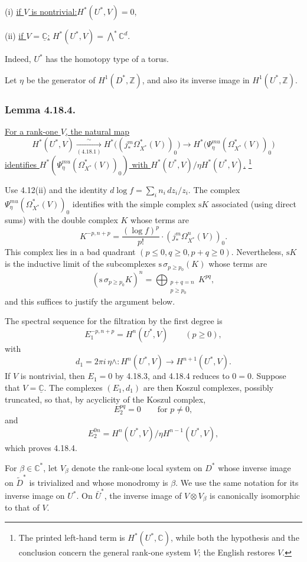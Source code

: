 \noindent\textup{(i)}\qquad
\uline{if $V$ is nontrivial:}\quad $H^*(U^*,V)=0$,

\medskip
\noindent\textup{(ii)}\qquad
\uline{if $V=\underline{\mathbb C}$:}\quad
$H^*(U^*,V)=\bigwedge\nolimits^*\mathbb C^d$.

Indeed, $U^*$ has the homotopy type of a torus.

Let $\eta$ be the generator of $H^1(D^*,\mathbb Z)$, and also its
inverse image in $H^1(U^*,\mathbb Z)$.

\subsubsection*{Lemma 4.18.4.}
\underline{For a rank-one $V$, the natural map}
\[
H^*(U^*,V)
 \xrightarrow[(4.18.1)]{\ \sim\ }
H^*\bigl((j_*^m\Omega_{X^*}^*(V))_0\bigr)
 \longrightarrow
H^*\bigl(\Psi_\eta^{mu}(\Omega_{X^*}^*(V))_0\bigr)
\]
\underline{identifies
$H^*(\Psi_\eta^{mu}(\Omega_{X^*}^*(V))_0)$ with
$H^*(U^*,V)/\eta H^*(U^*,V)$.}
\footnote{The printed left-hand term is $H^*(U^*,\mathbb C)$,
while both the hypothesis and the conclusion concern the general
rank-one system $V$; the English restores $V$.}

Use 4.12(ii) and the identity
$d\log f=\sum_i n_i\,dz_i/z_i$.  The complex
$\Psi_\eta^{mu}(\Omega_{X^*}^*(V))_0$ identifies with the simple
complex $\mathrm{s}K$ associated (using direct sums) with the double
complex $K$ whose terms are
\[
K^{-p,n+p}=\frac{(\log f)^p}{p!}\cdot
  (j_*^m\Omega_{X^*}^n(V))_0.
\]
This complex lies in a bad quadrant
$(p\leq0,q\geq0,p+q\geq0)$.  Nevertheless, $\mathrm{s}K$ is the
inductive limit of the subcomplexes
$\mathrm{s}\,\sigma_{p\geq p_0}(K)$ whose terms are
\[
(\mathrm{s}\,\sigma_{p\geq p_0}K)^n
=\bigoplus_{\substack{p+q=n\\p\geq p_0}}K^{pq},
\]
and this suffices to justify the argument below.

The spectral sequence for the filtration by the first degree is
\[
E_1^{-p,n+p}=H^n(U^*,V)\qquad(p\geq0),
\]
with
\[
d_1=2\pi i\,\eta\wedge:
H^n(U^*,V)\longrightarrow H^{n+1}(U^*,V).
\]
If $V$ is nontrivial, then $E_1=0$ by 4.18.3, and 4.18.4 reduces
to $0=0$.  Suppose that $V=\underline{\mathbb C}$.  The complexes
$(E_1,d_1)$ are then Koszul complexes, possibly truncated, so that,
by acyclicity of the Koszul complex,
\[
E_2^{pq}=0\qquad\text{for }p\ne0,
\]
and
\[
E_2^{0n}=H^n(U^*,V)/\eta H^{n-1}(U^*,V),
\]
which proves 4.18.4.

For $\beta\in\mathbb C^*$, let $V_\beta$ denote the rank-one local
system on $D^*$ whose inverse image on $\widetilde D^*$ is
trivialized and whose monodromy is $\beta$.  We use the same notation
for its inverse image on $U^*$.  On $\bar U^*$, the inverse image of
$V\otimes V_\beta$ is canonically isomorphic to that of $V$.

